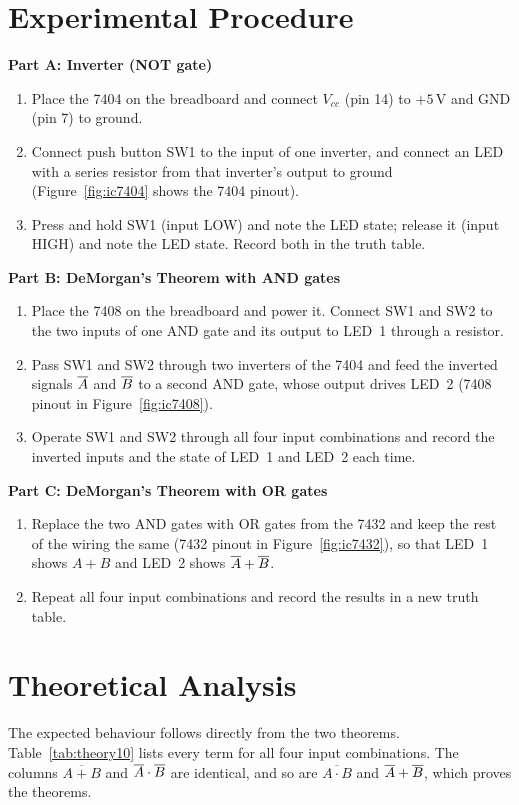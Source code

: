 \section{Experimental Procedure}
\textbf{Part A: Inverter (NOT gate)}
\begin{enumerate}
	\item Place the 7404 on the breadboard and connect $V_{cc}$ (pin 14) to $+5$\,V and GND (pin 7) to ground.
	\item Connect push button SW1 to the input of one inverter, and connect an LED with a series resistor from that inverter's output to ground (Figure~\ref{fig:ic7404} shows the 7404 pinout).
	\item Press and hold SW1 (input LOW) and note the LED state; release it (input HIGH) and note the LED state. Record both in the truth table.
\end{enumerate}
\textbf{Part B: DeMorgan's Theorem with AND gates}
\begin{enumerate}[resume]
	\item Place the 7408 on the breadboard and power it. Connect SW1 and SW2 to the two inputs of one AND gate and its output to LED~1 through a resistor.
	\item Pass SW1 and SW2 through two inverters of the 7404 and feed the inverted signals $\overline{A}$ and $\overline{B}$ to a second AND gate, whose output drives LED~2 (7408 pinout in Figure~\ref{fig:ic7408}).
	\item Operate SW1 and SW2 through all four input combinations and record the inverted inputs and the state of LED~1 and LED~2 each time.
\end{enumerate}
\textbf{Part C: DeMorgan's Theorem with OR gates}
\begin{enumerate}[resume]
	\item Replace the two AND gates with OR gates from the 7432 and keep the rest of the wiring the same (7432 pinout in Figure~\ref{fig:ic7432}), so that LED~1 shows $A+B$ and LED~2 shows $\overline{A}+\overline{B}$.
	\item Repeat all four input combinations and record the results in a new truth table.
\end{enumerate}

\section{Theoretical Analysis}
The expected behaviour follows directly from the two theorems. Table~\ref{tab:theory10} lists every term for all four input combinations. The columns $\overline{A+B}$ and $\overline{A}\cdot\overline{B}$ are identical, and so are $\overline{A\cdot B}$ and $\overline{A}+\overline{B}$, which proves the theorems.

